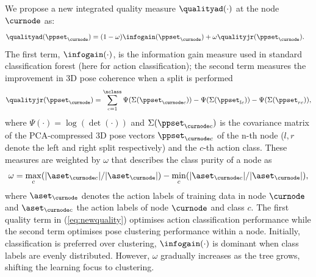 We propose a new integrated quality measure $\qualityad(\cdot)$ at the node $\curnode$ as:
\begin{align}
	\label{eq:newquality}
	\qualityad(\ppset_{\curnode}) & = (1 - \omega)\infogain(\ppset_{\curnode}) + \omega\qualityjr(\ppset_{\curnode}). 
\end{align}
The first term, $\infogain(\cdot)$, is the information gain measure used in standard classification forest \cite{Breiman2001} (here for action classification); the second term measures the improvement in 3D pose coherence when a split is performed    
\begin{equation}
	\qualityjr(\ppset_{\curnode}) = \displaystyle\sum_{c = 1}^{\nclass} \Psi(\Sigma(\ppset_{\curnode c})) - \Psi(\Sigma(\ppset_{lc})) 
- \Psi(\Sigma(\ppset_{rc})),
\end{equation} 
where $\Psi(\cdot) = \log(\det(\cdot)) $ and $\Sigma(\ppset_{\curnode c})$ is the covariance matrix of the PCA-compressed 3D pose vectors  $\ppset_{\curnode c}$ of the n-th node ($l,r$ denote the left and right split respectively) and the $c$-th action class. These measures are weighted by $\omega$ that describes the class purity of a node as
\begin{equation}
	\omega = \max_{c}(|\aset_{\curnode c}| / |\aset_{\curnode}|)- \min_{c} (|\aset_{\curnode c}| / | \aset_{\curnode}|),
\end{equation} 
where $\aset_{\curnode}$ denotes the action labels of training data in node $\curnode$ and $\aset_{\curnode c}$ the action labels of node $\curnode$ and class $c$. The first quality term in (\ref{eq:newquality})  optimises action classification performance while the second term optimises pose clustering performance within a node. Initially, classification is preferred over clustering, $\infogain(\cdot)$ is dominant when class labels are evenly distributed. However, $\omega$ gradually increases as the tree grows, shifting the learning focus to clustering. 

